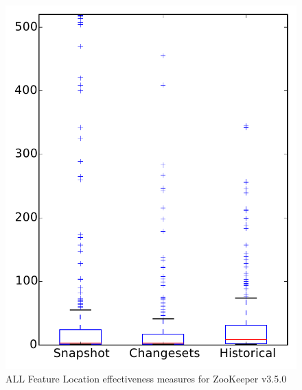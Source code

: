 
\begin{figure}
\centering
\includegraphics[height=0.4\textheight]{figures/flt/all_zookeeper}
\caption{ALL Feature Location effectiveness measures for ZooKeeper v3.5.0}
\label{fig:flt:all:zookeeper}
\end{figure}
